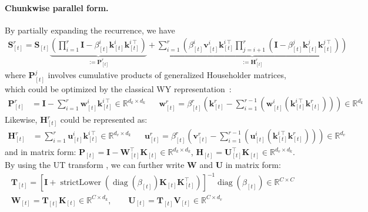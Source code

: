 \documentclass{article}
\def\rmH{{\mathbf{H}}}
\def\rmI{{\mathbf{I}}}
\def\rmK{{\mathbf{K}}}
\def\rmP{{\mathbf{P}}}
\def\rmS{{\mathbf{S}}}
\def\rmT{{\mathbf{T}}}
\def\rmU{{\mathbf{U}}}
\def\rmV{{\mathbf{V}}}
\def\rmW{{\mathbf{W}}}
\def\vk{{\bm{k}}}
\def\vu{{\bm{u}}}
\def\vv{{\bm{v}}}
\def\vw{{\bm{w}}}
\newcommand{\R}{\mathbb{R}}
\def\rmU{{\mathbf{U}}}
\def\rmH{{\mathbf{H}}}
\def\vw{\mathbf{w}}
\def\vu{\mathbf{u}}
\begin{document}
\paragraph{Chunkwise parallel form.}
By partially expanding the recurrence, we have
\begin{align}
 \rmS_{[t]}^r = \rmS_{[t]} \underbrace{\left(\prod_{i=1}^r \rmI - \beta_{[t]}^i \vk_{[t]}^i \vk_{[t]}^{i\intercal} \right)}_{:= \rmP_{[t]}^r} + \underbrace{\sum_{i=1}^{r} \left( \beta^i_{[t]} \vv^i_{[t]} \vk_{[t]}^{i\intercal}\prod_{j=i+1}^{r}  \left(\rmI - \beta_{[t]}^j \vk^j_{[t]} \vk_{[t]}^{j\intercal} \right) \right)}_{:= \rmH_{[t]}^r}    
 \label{eq:delta_rule_expand}
\end{align}
where $\rmP_{[t]}^j$ involves cumulative products of generalized Householder matrices, 
 which could be optimized by the classical WY representation~\citep{bischof_wy_1985}:\begin{align}
    \rmP_{[t]}^{r} &= \rmI - \sum_{i=1}^{r}\vw_{[t]}^i\vk_{[t]}^{i\intercal}  \in \mathbb{R}^{d_k \times d_k} 
     &&\vw_{[t]}^r = \beta_{[t]}^r \left(\vk_{[t]}^r -  \sum_{i=1}^{r-1} \left(\vw_{[t]}^i (\vk_{[t]}^{i\intercal}\vk_{[t]}^r) \right) \right) \in \mathbb{R}^{d_k} 
     \label{eq:wy-pw}
    \end{align}
    Likewise, $\rmH_{[t]}^r$ could be represented as:
    \vspace{-2mm}
    \begin{align}
 \rmH_{[t]}^{r} &= \sum_{i=1}^{r} \vu_{[t]}^i \vk_{[t]}^{i\intercal}  \in \R^{d_v \times d_k}  &&   \vu_{[t]}^r = \beta_{[t]}^r \left(\vv_{[t]}^r -  \sum_{i=1}^{r-1} \left(\vu_{[t]}^i (\vk_{[t]}^{i\intercal}\vk_{[t]}^r) \right) \right)\in \mathbb{R}^{d_v}
 \label{eq:wy-ph}
    \end{align}
and in matrix form: $\rmP_{[t]}=\rmI-\rmW_{[t]}^\top\rmK_{[t]} \in \mathbb{R}^{d_k \times d_k}$, $\rmH_{[t]}=\rmU_{[t]}^\top\rmK_{[t]} \in \mathbb{R}^{d_v\times d_k}$. By using the UT transform \citep{Joffrain2006AccumulatingHT}, we can further write $\rmW$ and $\rmU$ in matrix form:\begin{align}
   \rmT_{[t]} = \left[\rmI + \operatorname{strictLower}\left(\operatorname{diag}(\beta_{[t]})\rmK_{[t]} \rmK_{[t]}^\intercal\right)\right]^{-1}\operatorname{diag}\left(\beta_{[t]}\right) 
   \in \mathbb{R}^{C \times C} 
   \label{eq:inverse}\\
   \rmW_{[t]}= \rmT_{[t]} \rmK_{[t]}  
   \in \mathbb{R}^{C \times d_k}, \qquad
   \rmU_{[t]}=\rmT_{[t]}\rmV_{[t]} 
   \in \mathbb{R}^{C \times d_v}
   \label{eq:wu=akv}
\end{align}
\end{document}
